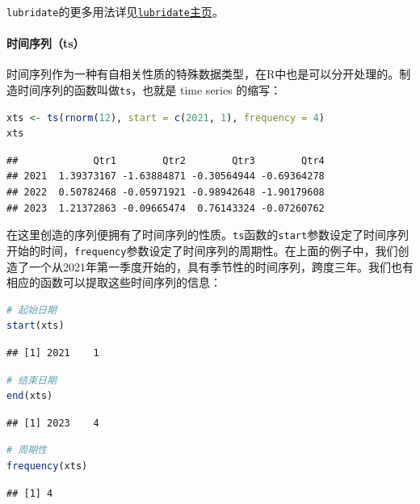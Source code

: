 \documentclass[]{ctexbook}
\let\oldparagraph\paragraph
\renewcommand{\paragraph}[1]{\oldparagraph{#1}\mbox{}}
\newcommand{\passthrough}[1]{#1}
\begin{document}
\passthrough{\lstinline!lubridate!}的更多用法详见\href{https://lubridate.tidyverse.org/}{\passthrough{\lstinline!lubridate!}主页}。

\hypertarget{ux65f6ux95f4ux5e8fux5217ts}{%
\paragraph{时间序列（ts）}\label{ux65f6ux95f4ux5e8fux5217ts}}

时间序列作为一种有自相关性质的特殊数据类型，在R中也是可以分开处理的。制造时间序列的函数叫做\passthrough{\lstinline!ts!}，也就是 time series 的缩写：

\begin{lstlisting}[language=R]
xts <- ts(rnorm(12), start = c(2021, 1), frequency = 4)
xts
\end{lstlisting}

\begin{lstlisting}
##             Qtr1        Qtr2        Qtr3        Qtr4
## 2021  1.39373167 -1.63884871 -0.30564944 -0.69364278
## 2022  0.50782468 -0.05971921 -0.98942648 -1.90179608
## 2023  1.21372863 -0.09665474  0.76143324 -0.07260762
\end{lstlisting}

在这里创造的序列便拥有了时间序列的性质。\passthrough{\lstinline!ts!}函数的\passthrough{\lstinline!start!}参数设定了时间序列开始的时间，\passthrough{\lstinline!frequency!}参数设定了时间序列的周期性。在上面的例子中，我们创造了一个从2021年第一季度开始的，具有季节性的时间序列，跨度三年。我们也有相应的函数可以提取这些时间序列的信息：

\begin{lstlisting}[language=R]
# 起始日期
start(xts)
\end{lstlisting}

\begin{lstlisting}
## [1] 2021    1
\end{lstlisting}

\begin{lstlisting}[language=R]
# 结束日期
end(xts)
\end{lstlisting}

\begin{lstlisting}
## [1] 2023    4
\end{lstlisting}

\begin{lstlisting}[language=R]
# 周期性
frequency(xts)
\end{lstlisting}

\begin{lstlisting}
## [1] 4
\end{lstlisting}
\end{document}
